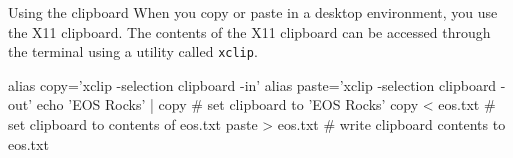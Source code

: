 \begin{block}{Using the clipboard}
  When you copy or paste in a desktop environment, you use the X11 clipboard. The contents of the X11 clipboard can be accessed through the terminal using a utility called \texttt{xclip}.
  \begin{indented}
    \begin{bashcode}
      alias copy='xclip -selection clipboard -in'
      alias paste='xclip -selection clipboard -out'
      echo 'EOS Rocks' | copy # set clipboard to 'EOS Rocks'
      copy < eos.txt          # set clipboard to contents of eos.txt
      paste > eos.txt         # write clipboard contents to eos.txt
    \end{bashcode}
  \end{indented}
\end{block}
